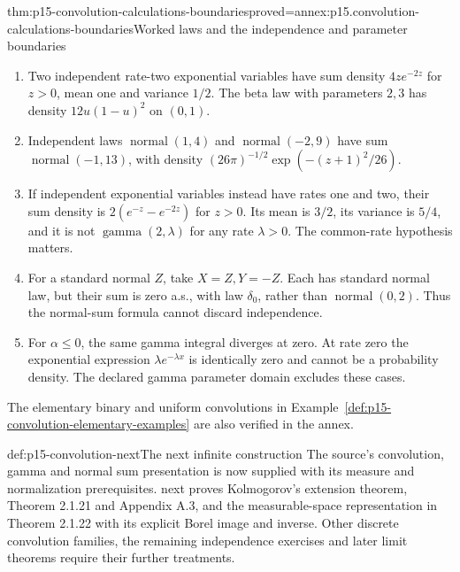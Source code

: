 \begin{hbtheorem}{thm:p15-convolution-calculations-boundaries}{proved=annex:p15.convolution-calculations-boundaries}{Worked laws and the independence and parameter boundaries}
\par\nobreak
\begin{enumerate}
\item Two independent rate-two exponential variables have sum density
      \(4z e^{-2z}\) for \(z>0\), mean one and variance \(1/2\).
      The beta law with parameters \(2,3\) has density
      \(12u(1-u)^2\) on \((0,1)\).
\item Independent laws \(\operatorname{normal}(1,4)\) and
      \(\operatorname{normal}(-2,9)\) have sum
      \(\operatorname{normal}(-1,13)\), with density
      \((26\pi)^{-1/2}\exp(-(z+1)^2/26)\).
\item If independent exponential variables instead have rates one and
      two, their sum density is \(2(e^{-z}-e^{-2z})\) for \(z>0\).
      Its mean is \(3/2\), its variance is \(5/4\), and it is
      not \(\operatorname{gamma}(2,\lambda)\) for any rate
      \(\lambda>0\). The common-rate hypothesis matters.
\item For a standard normal \(Z\), take \(X=Z,Y=-Z\).
      Each has standard normal law, but their sum is zero a.s., with
      law \(\delta_0\), rather than \(\operatorname{normal}(0,2)\).
      Thus the normal-sum formula cannot discard independence.
\item For \(\alpha\leq0\), the same gamma integral
      diverges at zero. At rate zero the exponential expression
      \(\lambda e^{-\lambda x}\) is identically zero and cannot
      be a probability density. The declared gamma parameter domain
      excludes these cases.
\end{enumerate}
The elementary binary and uniform convolutions in
Example~\ref{def:p15-convolution-elementary-examples} are also verified
in the annex.
\end{hbtheorem}

\begin{proofboundary}{def:p15-convolution-next}{The next infinite construction}
The source's convolution, gamma and normal sum presentation is now
supplied with its measure and normalization prerequisites.
 next proves Kolmogorov's
extension theorem, Theorem 2.1.21 and Appendix A.3, and the
measurable-space representation in Theorem 2.1.22 with its explicit
Borel image and inverse. Other discrete convolution families, the
remaining independence exercises and later limit theorems require
their further treatments.
\end{proofboundary}
